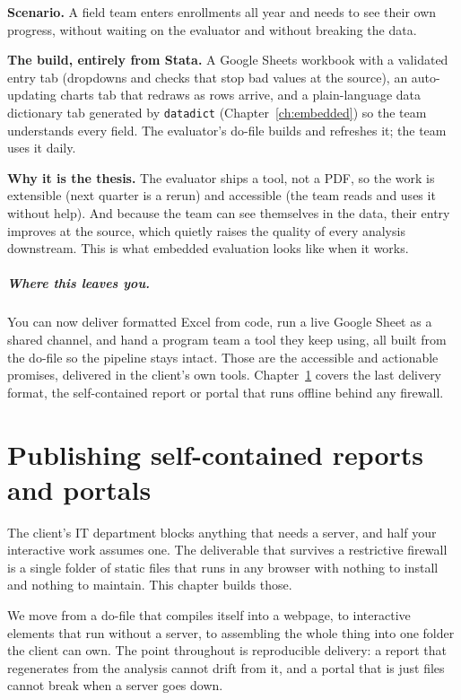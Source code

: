 \documentclass[
    a4paper,
    fontsize=10pt,
    twoside=true,
    numbers=noenddot,
]{kaobook}
\newcounter{appliedexample}
\newenvironment{appliedexample}[1][]{%
    \refstepcounter{appliedexample}%
    \begin{appliedexamplebox}[frametitle={Applied Example~\theappliedexample.~~#1}]%
}{%
    \end{appliedexamplebox}%
}
\begin{document}
\begin{appliedexample}[An enrollment tracker the field team keeps]
\textbf{Scenario.} A field team enters enrollments all year and needs to see their own progress, without waiting on the evaluator and without breaking the data.

\medskip
\textbf{The build, entirely from Stata.} A Google Sheets workbook with a validated entry tab (dropdowns and checks that stop bad values at the source), an auto-updating charts tab that redraws as rows arrive, and a plain-language data dictionary tab generated by \texttt{datadict} (Chapter~\ref{ch:embedded}) so the team understands every field. The evaluator's do-file builds and refreshes it; the team uses it daily.

\medskip
\textbf{Why it is the thesis.} The evaluator ships a tool, not a PDF, so the work is extensible (next quarter is a rerun) and accessible (the team reads and uses it without help). And because the team can see themselves in the data, their entry improves at the source, which quietly raises the quality of every analysis downstream. This is what embedded evaluation looks like when it works.
\end{appliedexample}

\paragraph{Where this leaves you.} You can now deliver formatted Excel from code, run a live Google Sheet as a shared channel, and hand a program team a tool they keep using, all built from the do-file so the pipeline stays intact. Those are the accessible and actionable promises, delivered in the client's own tools. Chapter~\ref{ch:portals} covers the last delivery format, the self-contained report or portal that runs offline behind any firewall.

\chapter{Publishing self-contained reports and portals}\label{ch:portals}

The client's IT department blocks anything that needs a server, and half your interactive work assumes one. The deliverable that survives a restrictive firewall is a single folder of static files that runs in any browser with nothing to install and nothing to maintain. This chapter builds those.

We move from a do-file that compiles itself into a webpage, to interactive elements that run without a server, to assembling the whole thing into one folder the client can own. The point throughout is reproducible delivery: a report that regenerates from the analysis cannot drift from it, and a portal that is just files cannot break when a server goes down.
\end{document}
